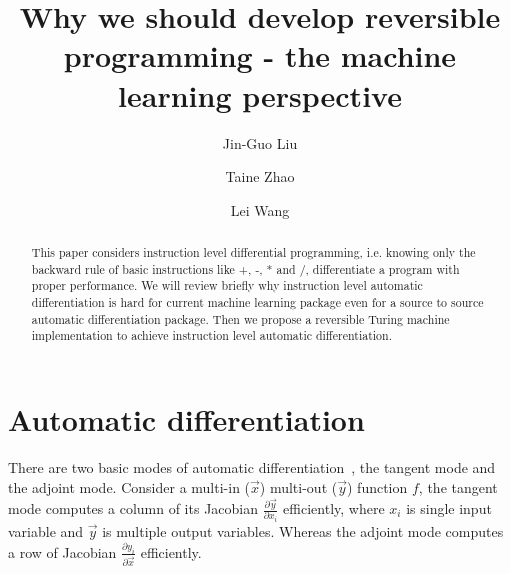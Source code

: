 \documentclass[aps,twocolumn,longbibliography,english,superscriptaddress,prr]{revtex4-1}
\newcommand{\<}{\langle}
\renewcommand{\>}{\rangle}
\begin{document}
\title{Why we should develop reversible programming - the machine learning perspective}

\author{Jin-Guo Liu}
\author{Taine Zhao}
\author{Lei Wang}

\begin{abstract}
    This paper considers instruction level differential programming, i.e. knowing only the backward rule of basic instructions like +, -, * and /, differentiate a program with proper performance. We will review briefly why instruction level automatic differentiation is hard for current machine learning package even for a source to source automatic differentiation package. Then we propose a reversible Turing machine implementation to achieve instruction level automatic differentiation.
\end{abstract}
\maketitle

\section{Automatic differentiation}
There are two basic modes of automatic differentiation~\cite{thelongpaper}, the tangent mode\cite{forwarddiff} and the adjoint mode.
Consider a multi-in ($\vec{x}$) multi-out ($\vec{y}$) function $f$, the tangent mode computes a column of its Jacobian $\frac{\partial \vec{y}}{\partial x_i}$ efficiently, where $x_i$ is single input variable and $\vec{y}$ is multiple output variables.
Whereas the adjoint mode computes a row of Jacobian $\frac{\partial y_i}{\partial \vec{x}}$ efficiently.
\end{document}
